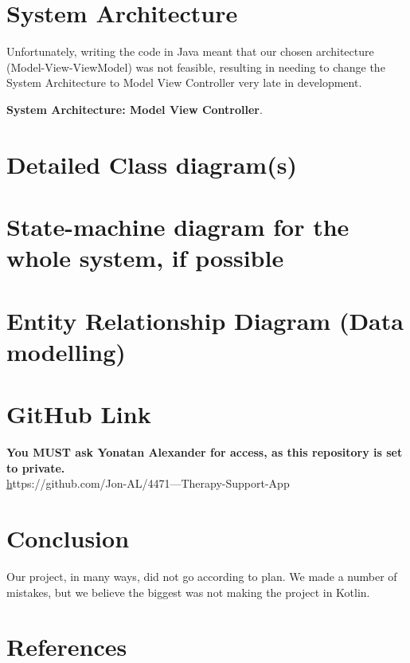 \documentclass[11pt]{article}
\begin{document}
    \section{System Architecture}\label{sec:system-architecture}

    Unfortunately, writing the code in Java meant that our chosen architecture (Model-View-ViewModel) was not feasible, resulting in needing to change the System Architecture to Model View Controller very late in development.

    \textbf{System Architecture: Model View Controller}.


    \section{Detailed Class diagram(s)}\label{sec:detailed-class-diagram(s)}


    \section{State-machine diagram {for the whole system, if possible}}\label{sec:state-machine-diagram}


    \section{Entity Relationship Diagram (Data modelling)}\label{sec:er--diagram-(data-modelling)}


    \section{GitHub Link}\label{sec:github-link}

    \textbf{You MUST ask Yonatan Alexander for access, as this repository is set to private.}\\

    \href{Group Therapy-Support-App}
    https://github.com/Jon-AL/4471---Therapy-Support-App


    \section{Conclusion}\label{sec:conclusion}

    Our project, in many ways, did not go according to plan.
    We made a number of mistakes, but we believe the biggest was not making the project in Kotlin.


    \section{References}\label{sec:reference}
\end{document}
